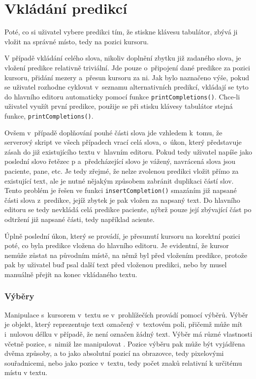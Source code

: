 \documentclass[a4paper,11pt,openany]{book} %
\newcommand\exmp{\textsf}
\begin{document}
\section{Vkládání predikcí}

Poté, co si uživatel vybere predikci tím, že stiskne klávesu tabulátor, zbývá ji vložit na správné místo, tedy na pozici kursoru.

V případě vkládání celého slova, nikoliv doplnění zbytku již zadaného slova, je vložení predikce relativně triviální. Jde pouze o~připojení dané predikce za pozici kursoru, přidání mezery a~přesun kursoru za ni. Jak bylo naznačeno výše, pokud se uživatel rozhodne cyklovat v~seznamu alternativních predikcí, vkládají se tyto do hlavního editoru automaticky pomocí funkce {\tt printCompletions()}. Chce-li uživatel využít první predikce, použije se při stisku klávesy tabulátor stejná funkce, {\tt printCompletions()}. 

Ovšem v~případě doplňování pouhé části slova jde vzhledem k~tomu, že serverový skript ve všech případech vrací celá slova, o~úkon, který představuje zásah do již existujícího textu v~hlavním editoru. Pokud tedy uživatel napíše jako poslední slovo řetězec \exmp{p} a~předcházející slovo je \exmp{vážený}, navrácená slova jsou \exmp{paciente}, \exmp{pane}, etc. Je tedy zřejmé, že nelze zvolenou predikci vložit přímo za existující text, ale je nutné nějakým způsobem zabránit duplikaci částí slov. Tento problém je řešen ve funkci {\tt insertCompletion()} smazáním již napsané části slova z~predikce, jejíž zbytek je pak vložen za napsaný text. Do hlavního editoru se tedy nevkládá celá predikce \exmp{paciente}, nýbrž pouze její zbývající část po odtržení již napsané části, tedy například \exmp{aciente}.

Úplně poslední úkon, který se provádí, je přesunutí kursoru na korektní pozici poté, co byla predikce vložena do hlavního editoru. Je evidentní, že kursor nemůže zůstat na původním místě, na němž byl před vložením predikce, protože pak by uživatel buď psal další text před vloženou predikci, nebo by musel manuálně přejít na konec vkládaného textu. 

\subsubsection{Výběry}\label{vybery}

Manipulace s~kursorem v~textu se v~prohlížečích provádí pomocí výběrů. Výběr je objekt, který reprezentuje text označený v~textovém poli, přičemž může mít i~nulovou délku v případě, že není označen žádný text. Výběr má různé vlastnosti včetně pozice, s~nimiž lze manipulovat \parencite{mdn2015selections}. Pozice výběru pak může být vyjádřena dvěma způsoby, a to jako absolutní pozicí na obrazovce, tedy pixelovými souřadnicemi, nebo jako pozice v~textu, tedy počet znaků relativní k určitému místu v textu. %
\end{document}
